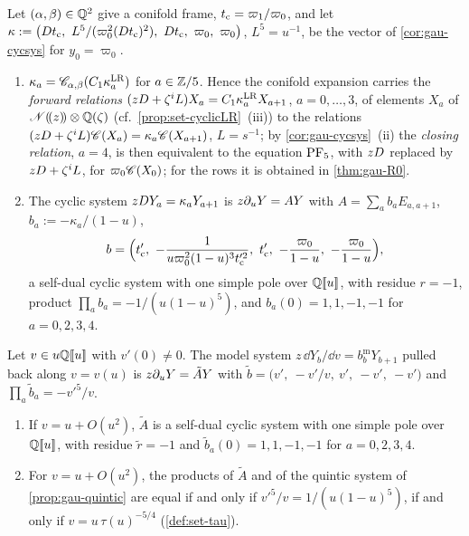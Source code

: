 \begin{prop}
\label{prop:gau-quintic}
Let $(\alpha,\beta)\in\mathbb{Q}^2$ give a conifold frame, $t_{\mathrm{c}}=\varpi_1/\varpi_0$, and let $\kappa:=\bigl(\Dq\tc,\ L^5/(\varpi_0^2(\Dq\tc)^2),\ \Dq\tc,\ \varpi_0,\ \varpi_0\bigr)$, $L^5=u^{-1}$, be the vector of \cref{cor:gau-cycsys} for $y_0=\varpi_0$.
\begin{enumerate}
\item $\kappa_a=\mathscr{C}_{\alpha,\beta}(C_1\kappa^{\mathrm{LR}}_a)$ for $a\in\mathbb{Z}/5$. Hence the conifold expansion carries the \emph{forward relations} $(zD+\zeta^iL)X_a=C_1\kappa^{\mathrm{LR}}_aX_{a+1}$, $a=0,\dots,3$, of elements $X_a$ of $\mathscr{N}(\!(z)\!)\otimes\mathbb{Q}(\zeta)$ (cf.\ \cref{prop:set-cyclicLR}~(iii)) to the relations $(zD+\zeta^iL)\mathscr{C}(X_a)=\kappa_a\mathscr{C}(X_{a+1})$, $L=s^{-1}$; by \cref{cor:gau-cycsys}~(ii) the \emph{closing relation}, $a=4$, is then equivalent to the equation $\mathrm{PF}_{5}$, with $zD$ replaced by $zD+\zeta^iL$, for $\varpi_0\mathscr{C}(X_0)$; for the rows it is obtained in \cref{thm:gau-R0}.
\item The cyclic system $zD Y_a=\kappa_aY_{a+1}$ is $z\partial_uY=AY$ with $A=\sum_ab_aE_{a,a+1}$, $b_a:=-\kappa_a/(1-u)$,
\[
b=\Bigl(\tc',\ -\frac1{u\varpi_0^2(1-u)^3\tc'^2},\ \tc',\ -\frac{\varpi_0}{1-u},\ -\frac{\varpi_0}{1-u}\Bigr),
\]
a self-dual cyclic system with one simple pole over $\mathbb{Q}[\![ u ]\!]$, with residue $r=-1$, product $\prod_ab_a=-1/(u(1-u)^5)$, and $b_a(0)=1,1,-1,-1$ for $a=0,2,3,4$.
\end{enumerate}
\end{prop}

\begin{prop}
\label{prop:gau-equalprod}
Let $v\in u\mathbb{Q}[\![ u ]\!]$ with $v'(0)\neq0$. The model system $z\,\dd Y_b/\dd v=b^{\mathrm m}_bY_{b+1}$ pulled back along $v=v(u)$ is $z\partial_uY=\tilde AY$ with $\tilde b=\bigl(v',\ -v'/v,\ v',\ -v',\ -v'\bigr)$ and $\prod_a\tilde b_a=-v'^5/v$.
\begin{enumerate}
\item If $v=u+O(u^2)$, $\tilde A$ is a self-dual cyclic system with one simple pole over $\mathbb{Q}[\![ u ]\!]$, with residue $\tilde r=-1$ and $\tilde b_a(0)=1,1,-1,-1$ for $a=0,2,3,4$.
\item For $v=u+O(u^2)$, the products of $\tilde A$ and of the quintic system of \cref{prop:gau-quintic} are equal if and only if $v'^5/v=1/(u(1-u)^5)$, if and only if $v=u\,\tau(u)^{-5/4}$ (\cref{def:set-tau}).
\end{enumerate}
\end{prop}


